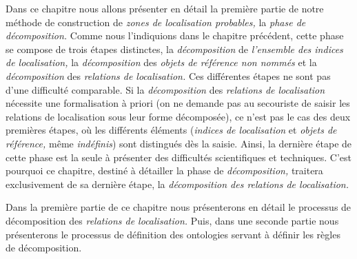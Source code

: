 Dans ce chapitre nous allons présenter en détail la première partie de
notre méthode de construction de \emph{zones de localisation
  probables,} la \emph{phase de décomposition.} Comme nous
l'indiquions dans le chapitre précédent, cette phase se compose de
trois étapes distinctes, la \emph{décomposition} de \emph{l'ensemble
  des indices de localisation,} la \emph{décomposition} des
\emph{objets de référence non nommés} et la \emph{décomposition} des
\emph{relations de localisation.} Ces différentes étapes ne sont pas
d'une difficulté comparable. Si la \emph{décomposition} des
\emph{relations de localisation} nécessite une formalisation à priori
(on ne demande pas au secouriste de saisir les relations de
localisation sous leur forme décomposée), ce n'est pas le cas des deux
premières étapes, où les différents éléments (\emph{indices de
  localisation} et \emph{objets de référence,} même \emph{indéfinis})
sont distingués dès la saisie. Ainsi, la dernière étape de cette phase
est la seule à présenter des difficultés scientifiques et
techniques. C'est pourquoi ce chapitre, destiné à détailler la phase
de \emph{décomposition,} traitera exclusivement de sa dernière étape,
la \emph{décomposition des relations de localisation.}

Dans la première partie de ce chapitre nous présenterons en détail le
processus de décomposition des \emph{relations de localisation.} Puis,
dans une seconde partie nous présenterons le processus de définition
des ontologies servant à définir les règles de décomposition.

